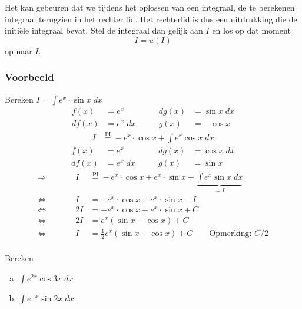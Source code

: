 \documentclass[a4paper,12pt, twoside]{article}
\begin{document}
Het kan gebeuren dat we tijdens het oplossen van een integraal, de te berekenen integraal terugzien in het rechter lid. Het rechterlid is dus een uitdrukking die de initiële integraal bevat. Stel de integraal dan gelijk aan $I$ en los op dat moment
$$I=u(I)$$
op naar $I$.

\subsubsection*{Voorbeeld}

Bereken $\displaystyle I=\int e^x \cdot \sin x \; dx$
\begin{alignat*}{3}
  f(x) &= e^x \qquad & dg(x) &= \sin x \; dx\\
  df(x) &= e^x \; dx \qquad & g(x) &= - \cos x
\end{alignat*}
\begin{align*}
  I
  &\overset{\text{PI}}{=} -e^x \cdot \cos x + \int e^x \cos x \; dx
\end{align*}
\begin{alignat*}{3}
  f(x) &= e^x \qquad & dg(x) &= \cos x \; dx\\
  df(x) &= e^x \; dx \qquad & g(x) &= \sin x
\end{alignat*}
\begin{alignat*}{2}
  \Rightarrow \qquad && I
  &\overset{\text{PI}}{=} -e^x \cdot \cos x + e^x \cdot \sin x - \underbrace{\int e^x \sin x \; dx}_{=I}\\
  \Leftrightarrow \qquad && I & = -e^x \cdot \cos x + e^x \cdot \sin x - I\\
  \Leftrightarrow \qquad && 2I & = -e^x \cdot \cos x + e^x \cdot \sin x + C\\
  \Leftrightarrow \qquad && 2I & = e^x \left(\sin x - \cos x\right) + C\\
  \Leftrightarrow \qquad && I & = \frac{1}{2} e^x \left(\sin x - \cos x\right) + C \qquad \text{Opmerking: } C/2\\
\end{alignat*}

\begin{oefening}
  Bereken
  \begin{multicols}{2}
  \begin{enumerate}[(a)]
  \item $\displaystyle\int e^{2x} \cos 3x \;dx$
  \item $\displaystyle\int e^{-x} \sin 2x \;dx$
  \end{enumerate}
\end{multicols}
\end{oefening}
\end{document}
